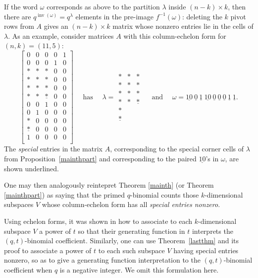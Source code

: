 \documentclass[10pt]{amsart}
\theoremstyle{plain}
\theoremstyle{definition}
\theoremstyle{remark}
\numberwithin{equation}{section}
\newcommand\inv{\operatorname{inv}}
\begin{document}
If the word $\omega$ corresponds as above to the partition
$\lambda$ inside $(n-k) \times k$, then there
are $q^{\inv(\omega)}=q^{\lambda}$ elements in the pre-image $f^{-1}(\omega)$:
deleting the $k$ pivot rows from $A$ gives an $(n-k) \times k$ matrix
whose nonzero entries lie in the cells of $\lambda$.  
As an example, consider matrices $A$ with this column-echelon form
for $(n,k)=(11,5)$:
$$
\left[
\begin{matrix}
0 & 0 & 0 & 0 & 1 \\
0 & 0 & 0 & 1 & 0 \\
* & * & * & 0 & 0 \\
* & * & * & 0 & 0 \\
* & * & * & 0 & 0 \\
* & * & \underline{*} & 0 & 0 \\
0 & 0 & 1 & 0 & 0 \\
0 & 1 & 0 & 0 & 0 \\
* & 0 & 0 & 0 & 0 \\
\underline{*} & 0 & 0 & 0 & 0 \\
1 & 0 & 0 & 0 & 0 \\
\end{matrix}
\right]
\quad \text{ has }\quad
\lambda =
\begin{matrix}
* & * & * \\
* & * & * \\
* & * & * \\
* & * & \underline{*}\\
* &   &  \\
\underline{*} &  &  
\end{matrix}
\quad \text{ and } \quad
\omega=
\underline{10}\
\underline{0}\
\underline{1}\
\underline{10}\
\underline{0}\
\underline{0}\
\underline{0}\
\underline{1}\
\underline{1}.
$$
The {\it special} entries in 
the matrix $A$, corresponding to the special corner
cells of $\lambda$ from Proposition~\ref{mainthpart}
and corresponding to the paired $\underline{10}$'s in $\omega$, are
shown underlined.

One may then analogously reintepret 
Theorem \ref{mainth} (or Theorem \ref{mainthpart}) 
as saying that the primed $q$-binomial counts
those $k$-dimensional subspaces $V$ whose
column-echelon form has all {\it special entries nonzero}.

Using echelon forms, it was shown in \cite[\S 5.3]{RS} how to associate
to each $k$-dimensional subspace $V$ a power of $t$ so that their
generating function in $t$ interprets the $(q,t)$-binomial coefficient.
Similarly, one can use Theorem~\ref{lastthm} and its proof
to associate a power of $t$ to each such subspace $V$ having 
special entries nonzero,
so as to give a generating function interpretation to the $(q,t)$-binomial
coefficient when $q$ is a negative integer.  
We omit this formulation here.
\end{document}
